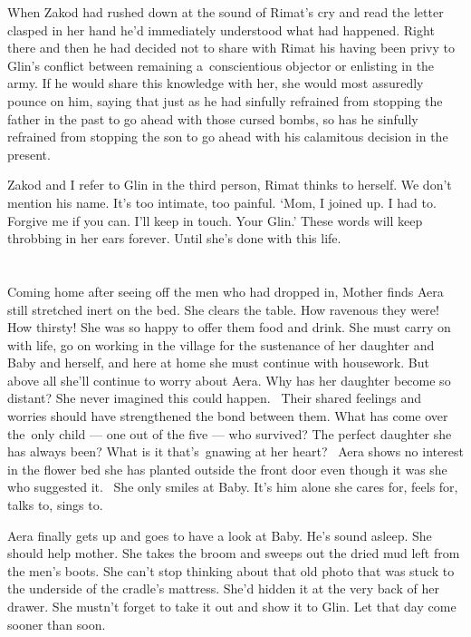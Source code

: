 \documentclass[twoside,11pt]{book}
\begin{document}
When Zakod had rushed down at the sound of Rimat's cry and read the letter clasped in her hand
he{'}d immediately understood what had happened. Right there and then he had decided not to share with
Rimat his having been privy to Glin's conflict between remaining a~conscientious objector or enlisting in the
army. If he would share this knowledge with her, she would most assuredly pounce on him, saying that just as he had
sinfully refrained from stopping the father in the past to go ahead with those cursed bombs, so has he
sinfully refrained from stopping the son to go ahead with his calamitous decision  in the present.

Zakod and I refer to Glin in the third person, Rimat thinks to herself. We don't mention his name. It's
too intimate, too painful. `Mom, I joined up. I had to. Forgive me if you can. I'll keep in touch. Your
Glin.' These words will keep throbbing in her ears forever. Until she's done with this life.


\chapter{}

Coming home after seeing off the men who had dropped in, Mother finds Aera still stretched inert on the bed. She clears
the table. How ravenous they were! How thirsty! She was so happy to offer them food and drink. She must carry on with
life, go on working in the village for the sustenance of her daughter and Baby\textbf{ }and herself, and here at home
she must continue with housework.{ }But above all she'll continue to worry about Aera. Why has her
daughter become so distant? She never imagined this could happen. ~Their shared feelings and worries should have
strengthened the bond between them. What has come over the~only child --- one out of the five --- who survived? The perfect
daughter she has always been? What is it that's~gnawing at her heart? ~Aera shows no interest in the flower bed she has
planted outside the front door even though it was she who suggested it. ~She only smiles at Baby. It's him alone she
cares for, feels for, talks to, sings to.

Aera finally gets up and goes to have a look at Baby. He's sound asleep. She should help mother. She takes the broom and
sweeps out the dried mud left from the men's boots. She can't stop thinking about that old photo that was stuck
to{ }the underside of the cradle's mattress. She'd hidden it at the very back of her drawer. She
mustn't forget to take it out and show it to Glin. Let that day come sooner than soon.
\end{document}
